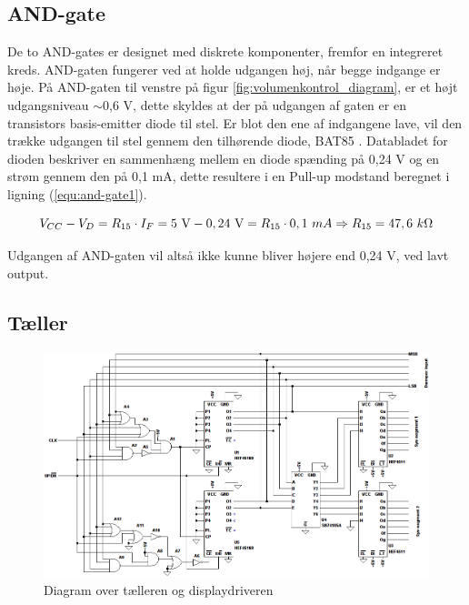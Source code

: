 \subsection*{AND-gate}
\label{volumenkontrol-design-and}

De to AND-gates er designet med diskrete komponenter, fremfor en integreret kreds. AND-gaten fungerer ved at holde udgangen høj, når begge indgange er høje. På AND-gaten til venstre på figur \ref{fig:volumenkontrol_diagram}, er et højt udgangsniveau $\sim$0,6 V, dette skyldes at der på udgangen af gaten er en transistors basis-emitter diode til stel. Er blot den ene af indgangene lave, vil den trække udgangen til stel gennem den tilhørende diode, BAT85 . Databladet for dioden beskriver en sammenhæng mellem en diode spænding på 0,24 V og en strøm gennem den på 0,1 mA, dette resultere i en Pull-up modstand beregnet i ligning (\ref{equ:and-gate1}).

\begin{equation}
\label{equ:and-gate1}
V_{CC} - V_D = R_{15} \cdot I_F = 5~\mathrm{V} - 0,24~\mathrm{V} = R_{15} \cdot 0,1~mA \Rightarrow R_{15} = 47,6~k\ohm
\end{equation}

Udgangen af AND-gaten vil altså ikke kunne bliver højere end 0,24 V, ved lavt output.

\clearpage
\subsection*{Tæller}
\label{volumenkontrol-design-taeller}

\begin{figure}[h]
\centering
\includegraphics[width=\textwidth]{teknisk/volumenkontrol/taeller.png}
\caption{Diagram over tælleren og displaydriveren}
\label{fig:taeller}
\end{figure}

